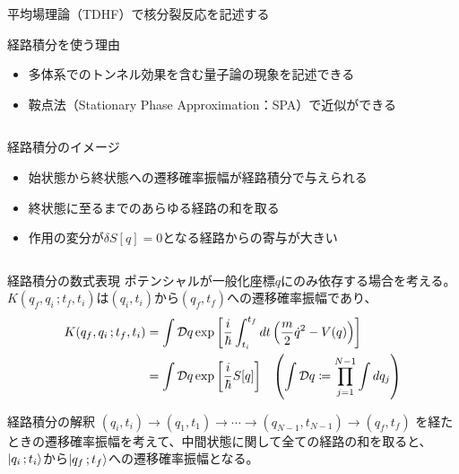 \documentclass[14pt,aspectratio=169,xcolor=dvipsnames,table,dvipdfmx]{beamer}
\theoremstyle{definition}
\begin{document}
\begin{frame}{平均場理論（TDHF）で核分裂反応を記述する}
  \begin{block}{経路積分を使う理由}
    \begin{itemize}
      \item 多体系でのトンネル効果を含む量子論の現象を記述できる
      \item 鞍点法（Stationary Phase Approximation：SPA）で近似ができる
    \end{itemize}
  \end{block}
  \begin{columns}[t]
    \begin{column}{.53\textwidth}
      \vspace{-5mm}
      \begin{exampleblock}{経路積分のイメージ}
        \begin{itemize}
          \item 始状態から終状態への遷移確率振幅が経路積分で与えられる
          \item 終状態に至るまでのあらゆる経路の和を取る
          \item 作用の変分が$\delta S[q]=0$となる経路からの寄与が大きい
        \end{itemize}
      \end{exampleblock}
    \end{column}
    \begin{column}{.44\textwidth}
    \end{column}
  \end{columns}

\end{frame}


\begin{frame}{経路積分の数式表現}
  ポテンシャルが一般化座標$q$にのみ依存する場合を考える。\\
  $K(q_f,q_i\,;t_f,t_i)$は$(q_i,t_i)$から$(q_f,t_f)$への遷移確率振幅であり、
  \begin{align*}
    K(q_f,q_i\,;t_f,t_i) & = \int\mathcal{D}q
    \exp\qty[\frac{i}{\hbar}\int_{t_i}^{t_f}dt\,\qty(\frac{m}{2}\dot{q}^2 - V(q))]                                                            \\
                         & = \int\mathcal{D}q\exp\qty[\frac{i}{\hbar}S[q]]\quad \qty(\int \mathcal{D}q \coloneqq \prod_{j=1}^{N-1} \int dq_j)
  \end{align*}
  \begin{block}{経路積分の解釈}
    $(q_i,t_i)\to(q_1,t_1)\to\cdots\to(q_{N-1},t_{N-1})\to(q_f,t_f)$
    を経たときの遷移確率振幅を考えて、中間状態に関して全ての経路の和を取ると、\\
    $\ket{q_i\,;t_i}$から$\ket{q_f\,;t_f}$への遷移確率振幅となる。
  \end{block}
\end{frame}
\end{document}
